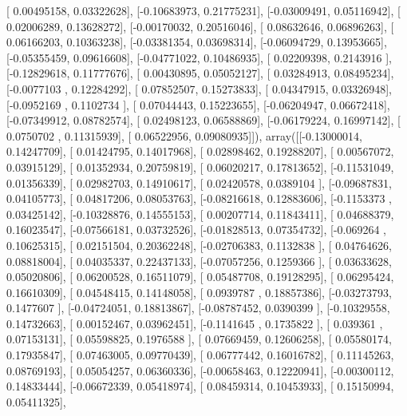 \documentclass{article}
\begin{document}
       [ 0.00495158,  0.03322628],
       [-0.10683973,  0.21775231],
       [-0.03009491,  0.05116942],
       [ 0.02006289,  0.13628272],
       [-0.00170032,  0.20516046],
       [ 0.08632646,  0.06896263],
       [ 0.06166203,  0.10363238],
       [-0.03381354,  0.03698314],
       [-0.06094729,  0.13953665],
       [-0.05355459,  0.09616608],
       [-0.04771022,  0.10486935],
       [ 0.02209398,  0.2143916 ],
       [-0.12829618,  0.11777676],
       [ 0.00430895,  0.05052127],
       [ 0.03284913,  0.08495234],
       [-0.0077103 ,  0.12284292],
       [ 0.07852507,  0.15273833],
       [ 0.04347915,  0.03326948],
       [-0.0952169 ,  0.1102734 ],
       [ 0.07044443,  0.15223655],
       [-0.06204947,  0.06672418],
       [-0.07349912,  0.08782574],
       [ 0.02498123,  0.06588869],
       [-0.06179224,  0.16997142],
       [ 0.0750702 ,  0.11315939],
       [ 0.06522956,  0.09080935]]), array([[-0.13000014,  0.14247709],
       [ 0.01424795,  0.14017968],
       [ 0.02898462,  0.19288207],
       [ 0.00567072,  0.03915129],
       [ 0.01352934,  0.20759819],
       [ 0.06020217,  0.17813652],
       [-0.11531049,  0.01356339],
       [ 0.02982703,  0.14910617],
       [ 0.02420578,  0.0389104 ],
       [-0.09687831,  0.04105773],
       [ 0.04817206,  0.08053763],
       [-0.08216618,  0.12883606],
       [-0.1153373 ,  0.03425142],
       [-0.10328876,  0.14555153],
       [ 0.00207714,  0.11843411],
       [ 0.04688379,  0.16023547],
       [-0.07566181,  0.03732526],
       [-0.01828513,  0.07354732],
       [-0.069264  ,  0.10625315],
       [ 0.02151504,  0.20362248],
       [-0.02706383,  0.1132838 ],
       [ 0.04764626,  0.08818004],
       [ 0.04035337,  0.22437133],
       [-0.07057256,  0.1259366 ],
       [ 0.03633628,  0.05020806],
       [ 0.06200528,  0.16511079],
       [ 0.05487708,  0.19128295],
       [ 0.06295424,  0.16610309],
       [ 0.04548415,  0.14148058],
       [ 0.0939787 ,  0.18857386],
       [-0.03273793,  0.1477607 ],
       [-0.04724051,  0.18813867],
       [-0.08787452,  0.0390399 ],
       [-0.10329558,  0.14732663],
       [ 0.00152467,  0.03962451],
       [-0.1141645 ,  0.1735822 ],
       [ 0.039361  ,  0.07153131],
       [ 0.05598825,  0.1976588 ],
       [ 0.07669459,  0.12606258],
       [ 0.05580174,  0.17935847],
       [ 0.07463005,  0.09770439],
       [ 0.06777442,  0.16016782],
       [ 0.11145263,  0.08769193],
       [ 0.05054257,  0.06360336],
       [-0.00658463,  0.12220941],
       [-0.00300112,  0.14833444],
       [-0.06672339,  0.05418974],
       [ 0.08459314,  0.10453933],
       [ 0.15150994,  0.05411325],
\end{document}
